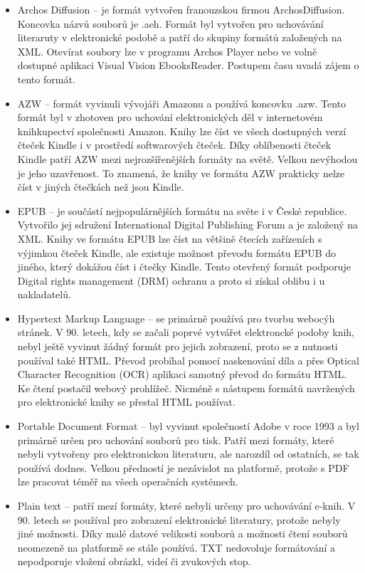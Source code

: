             \begin{itemize}
                \item Archos Diffusion – je formát vytvořen franouzskou firmou  ArchosDiffusion. Koncovka názvů souborů je .aeh. Formát byl vytvořen pro uchovávání literaruty v elektronické podobě a patří do skupiny formátů založených na XML. Otevírat soubory lze v programu Archos Player nebo ve volně dostupné aplikaci Visual Vision EbooksReader. Postupem času uvadá zájem o tento formát.
                \item AZW – formát vyvinuli vývojáři Amazonu a používá koncovku .azw. Tento formát byl v zhotoven pro uchování elektronických děl v internetovém knihkupectví společnosti Amazon. Knihy lze číst ve všech dostupných verzí čteček Kindle i v prostředí softwarových čteček. Díky oblíbenosti čteček Kindle patří AZW mezi nejrozšířenějších formáty na světě. Velkou nevýhodou je jeho uzavřenost. To znamená, že knihy ve formátu AZW prakticky nelze číst v jiných čtečkách než jsou Kindle.
                \item EPUB – je součástí nejpopulárnějších formátu na světe i v České republice. Vytvořilo jej sdružení International Digital Publishing Forum a je založený na XML. Knihy ve formátu EPUB lze číst na většině čtecích zařízeních s výjimkou čteček Kindle, ale existuje možnost převodu formátu EPUB do jiného, který dokážou číst i čtečky Kindle. Tento otevřený formát podporuje Digital rights management (DRM) ochranu a proto si získal oblibu i u nakladatelů.
                \item Hypertext Markup Language – se primárně používá pro tvorbu webocýh stránek. V 90. letech, kdy se začali poprvé vytvářet elektroncké podoby knih, nebyl ještě vyvinut žádný formát pro jejich zobrazení, proto se z nutnosti používal také HTML. Převod probíhal pomocí naskenování díla a přes Optical Character Recognition (OCR) aplikaci samotný převod do formátu HTML. Ke čtení postačil webový prohlížeč. Nicméně s nástupem formátů navržených pro elektronické knihy se přestal HTML používat.
                \item Portable Document Format – byl vyvinut společností Adobe v roce 1993 a byl primárně určen pro uchování souborů pro tisk. Patří mezi formáty, které nebyli vytvořeny pro elektronickou literaturu, ale narozdíl od ostatních, se tak používá dodnes. Velkou předností je nezávislot na platformě, protože s PDF lze pracovat téměř na všech operačních systémech. 
                \item Plain text – patří mezí formáty, které nebyli určeny pro uchovávání e-knih. V 90. letech se používal pro zobrazení elektronické literatury, protože nebyly jiné možnosti. Díky malé datové velikosti souborů a možnosti čtení souborů neomezeně na platformě se stále používá. TXT nedovoluje formátování a nepodporuje vložení obrázkl, videí či zvukových stop.

\end{itemize}
